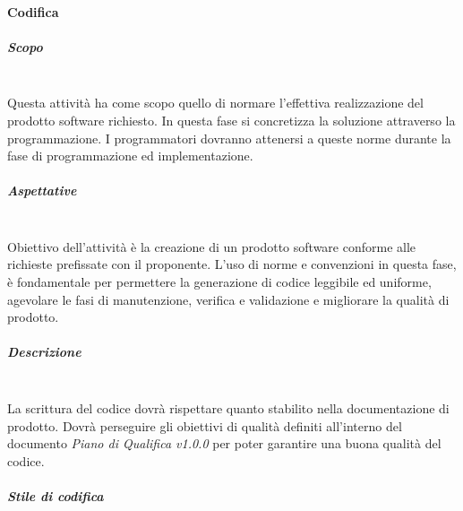 \paragraph{Codifica} 
\subparagraph{Scopo} \mbox{}\\

Questa attività ha come scopo quello di normare l'effettiva realizzazione del 
prodotto software richiesto. In questa fase si concretizza la soluzione 
attraverso la programmazione. I programmatori dovranno attenersi a queste norme 
durante la fase di programmazione ed implementazione. \newline \newline
			
\subparagraph{Aspettative} \mbox{}\\

Obiettivo dell'attività è la creazione di un prodotto software conforme alle 
richieste prefissate con il proponente.
L'uso di norme e convenzioni in questa fase, è fondamentale per permettere la 
generazione di codice leggibile ed uniforme,  agevolare le fasi di manutenzione, 
verifica e validazione e migliorare la qualità di prodotto. \newline \newline

\subparagraph{Descrizione} \mbox{}\\

La scrittura del codice dovrà rispettare quanto stabilito nella 
documentazione di prodotto. Dovrà perseguire gli obiettivi di qualità definiti 
all'interno del documento \textit{Piano di Qualifica v1.0.0} per poter garantire 
una buona qualità del codice. \newline \newline

\subparagraph{Stile di codifica} \mbox{}\\

